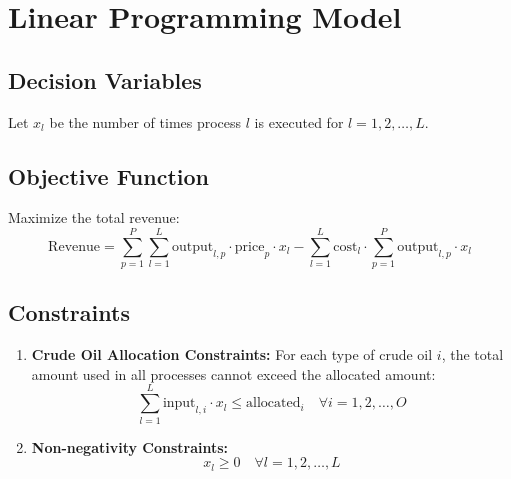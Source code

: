 \documentclass{article}
\begin{document}
\section*{Linear Programming Model}

\subsection*{Decision Variables}
Let \( x_l \) be the number of times process \( l \) is executed for \( l = 1, 2, \ldots, L \).

\subsection*{Objective Function}
Maximize the total revenue:
\[
\text{Revenue} = \sum_{p=1}^{P} \sum_{l=1}^{L} \text{output}_{l,p} \cdot \text{price}_p \cdot x_l - \sum_{l=1}^{L} \text{cost}_l \cdot \sum_{p=1}^{P} \text{output}_{l,p} \cdot x_l
\]

\subsection*{Constraints}
\begin{enumerate}
    \item \textbf{Crude Oil Allocation Constraints:} For each type of crude oil \( i \), the total amount used in all processes cannot exceed the allocated amount:
    \[
    \sum_{l=1}^{L} \text{input}_{l,i} \cdot x_l \leq \text{allocated}_i \quad \forall i = 1, 2, \ldots, O
    \]
    
    \item \textbf{Non-negativity Constraints:}
    \[
    x_l \geq 0 \quad \forall l = 1, 2, \ldots, L
    \]
\end{enumerate}
\end{document}
